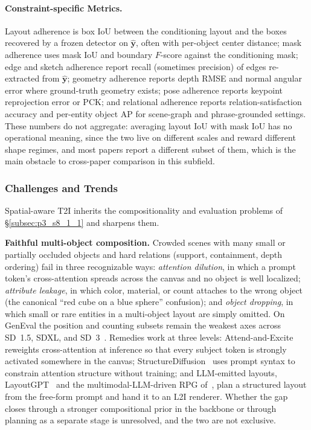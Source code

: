 \paragraph{Constraint-specific Metrics.}
Layout adherence is box IoU between the conditioning layout and the boxes recovered by a frozen detector on $\hat{\mathbf{y}}$, often with per-object center distance; mask adherence uses mask IoU and boundary $F$-score against the conditioning mask; edge and sketch adherence report recall (sometimes precision) of edges re-extracted from $\hat{\mathbf{y}}$; geometry adherence reports depth RMSE and normal angular error where ground-truth geometry exists; pose adherence reports keypoint reprojection error or PCK; and relational adherence reports relation-satisfaction accuracy and per-entity object AP for scene-graph and phrase-grounded settings.
These numbers do not aggregate: averaging layout IoU with mask IoU has no operational meaning, since the two live on different scales and reward different shape regimes, and most papers report a different subset of them, which is the main obstacle to cross-paper comparison in this subfield.


\subsubsection{Challenges and Trends}
\label{subsubsec:p3_s8_1_2_challenges}
Spatial-aware T2I inherits the compositionality and evaluation problems of §\ref{subsec:p3_s8_1_1} and sharpens them.

\textbf{Faithful multi-object composition.}
Crowded scenes with many small or partially occluded objects and hard relations (support, containment, depth ordering) fail in three recognizable ways: \emph{attention dilution}, in which a prompt token's cross-attention spreads across the canvas and no object is well localized; \emph{attribute leakage}, in which color, material, or count attaches to the wrong object (the canonical ``red cube on a blue sphere'' confusion); and \emph{object dropping}, in which small or rare entities in a multi-object layout are simply omitted.
On GenEval the position and counting subsets remain the weakest axes across SD~1.5, SDXL, and SD~3~\cite{sd3rft2024}.
Remedies work at three levels: Attend-and-Excite~\cite{chefer2023attend} reweights cross-attention at inference so that every subject token is strongly activated somewhere in the canvas; StructureDiffusion~\cite{feng2023training} uses prompt syntax to constrain attention structure without training; and LLM-emitted layouts, LayoutGPT~\cite{feng2023layoutgpt} and the multimodal-LLM-driven RPG of~\citet{yang2024mastering}, plan a structured layout from the free-form prompt and hand it to an L2I renderer.
Whether the gap closes through a stronger compositional prior in the backbone or through planning as a separate stage is unresolved, and the two are not exclusive.

